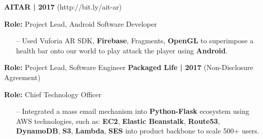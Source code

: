 \documentclass{article}
\begin{document}
\begin{multicols}{2}
{\footnotesize{\textbf{AITAR | 2017} (http://bit.ly/ait-ar)}}
{\footnotesize{
\newline\textbf{Role:} Project Lead, Android Software Developer
\begin{itemize}
	\item[--] Used Vuforia AR SDK, \textbf{Firebase}, Fragments, \textbf{OpenGL} to superimpose a health bar onto our world to play attack the player using \textbf{Android}.
\end{itemize} 
}}
\hfill \break
\newline\textbf{Role:} Project Lead, Software Engineer
{\footnotesize{\textbf{Packaged Life | 2017} (Non-Disclosure Agreement)}}
{\footnotesize{
\newline\textbf{Role:} Chief Technology Officer
\begin{itemize}
	\item[--] Integrated a mass email mechanism into \textbf{Python-Flask} ecosystem using AWS technologies, such as: \textbf{EC2}, \textbf{Elastic Beanstalk}, \textbf{Route53}, \textbf{DynamoDB}, \textbf{S3}, \textbf{Lambda}, \textbf{SES} into product backbone to scale 500+ users.
\end{itemize} 
}}

\end{multicols}
\end{document}
